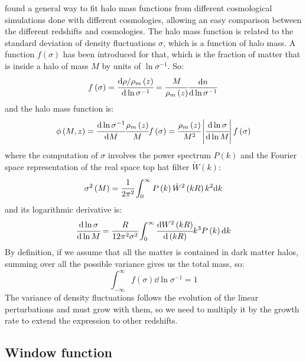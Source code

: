 \citet{Jenkins+01} found a general way to fit halo mass functions from
different cosmological simulations done with different cosmologies, allowing an
easy comparison between the different redshifts and cosmologies. The halo mass
function is related to the standard deviation of density fluctuations $\sigma$,
which is a function of halo mass. A function $f\left(\sigma\right)$ has been
introduced for that, which is the fraction of matter that is inside a halo of
mass $M$ by units of $\ln\sigma^{-1}$. So:
%
\begin{equation}
    f\left(\sigma\right)=
        \cfrac{{\rm{d}}\rho/\rho_m\left(z\right)}{{\rm{d}}\ln\sigma^{-1}}=
        \cfrac{M}{\rho_m\left(z\right)}\frac{{\rm{d}} n}{{\rm{d}}\ln\sigma^{-1}}
\end{equation}
%
and the halo mass function is:
%
\begin{equation}
    \phi\left(M,z\right)=\cfrac{{\rm{d}}\ln\sigma^{-1}}{{\rm{d}} M}
    \cfrac{\rho_m\left({z}\right)}{M}f\left(\sigma\right)=
    \cfrac{\rho_m\left(z\right)}{M^2}
    \left|\cfrac{{\rm{d}}\ln\sigma}{{\rm{d}}\ln M}\right|
    f\left(\sigma\right)
\end{equation}
%
where the computation of $\sigma$ involves the power spectrum $P\left(k\right)$
and the Fourier space representation of the real space top hat filter
$\tilde{W}\left(k\right)$:
%
\begin{equation}
    \sigma^2\left(M\right) =
    \cfrac{1}{2\pi^2}\int_0^\infty P\left(k\right)
    \tilde{W}^2\left(k R\right) k^2{\rm{d}} k
\end{equation}
%
and its logarithmic derivative is:
%
\begin{equation}
    \cfrac{{\rm{d}} \ln\sigma}{{\rm{d}}\ln M} = \cfrac{R}{12\pi^2\sigma^2}
    \int_0^\infty \cfrac{{\rm{d}} W^2 \left(kR\right)}{{\rm{d}} \left(kR\right)} k^3
    P \left(k\right) {\rm{d}} k
\end{equation}
%
By definition, if we assume that all the matter is contained in dark matter
halos, summing over all the possible variance gives us the total mass, so:
%
\begin{equation}
    \int_{-\infty}^\infty f\left(\sigma\right)\dd\ln\sigma^{-1}=1
\end{equation}
%
The variance of density fluctuations follows the evolution of the linear
perturbations and must grow with them, so we need to multiply it by the
growth rate to extend the expression to other redshifts.

\subsection{Window function}
\label{sub:window_function}


